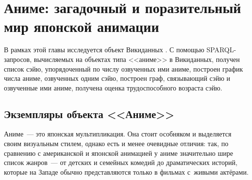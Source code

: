 
\chapter{Аниме: загадочный и поразительный мир японской анимации}
\label{ch:anime}

В рамках этой главы исследуется объект Викиданных . 
С помощью SPARQL-запросов, вычисляемых на объектах типа <<аниме>> в Викиданных, 
получен список сэйю, упорядоченный по числу озвученных ими аниме, 
построен график числа аниме, озвученных одним сэйю, 
построен граф, связывающий сэйю
и озвученные ими аниме, получена оценка трудоспособного возраста сэйю. 


\section{Экземпляры объекта <<Аниме>>}

Аниме~--- это японская мультипликация. 
Она стоит особняком и выделяется своим визуальным стилем, 
однако есть и менее очевидные отличия: 
так, по сравнению с американской и японской анимацией у аниме значительно шире список жанров~--- 
от детских и семейных комедий до драматических историй, 
которые на Западе обычно представляются только в фильмах 
с~живыми актёрами. %


